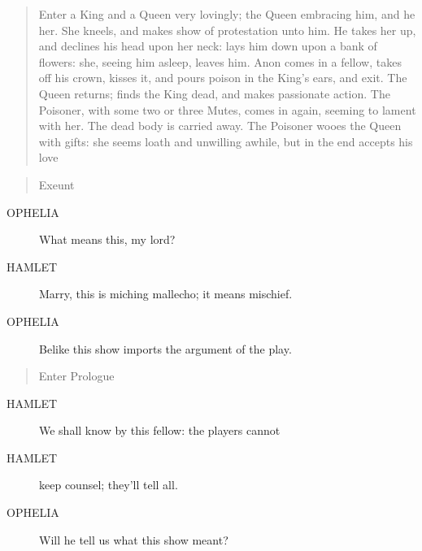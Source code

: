 \documentclass{article}
\begin{document}
\begin{quote}
Enter a King and a Queen very lovingly; the Queen
embracing him, and he her. She kneels, and makes
show of protestation unto him. He takes her up,
and declines his head upon her neck: lays him down
upon a bank of flowers: she, seeing him asleep,
leaves him. Anon comes in a fellow, takes off his
crown, kisses it, and pours poison in the King's
ears, and exit. The Queen returns; finds the King
dead, and makes passionate action. The Poisoner,
with some two or three Mutes, comes in again,
seeming to lament with her. The dead body is
carried away. The Poisoner wooes the Queen with
gifts: she seems loath and unwilling awhile, but
in the end accepts his love
\end{quote}
          
\begin{quote}
Exeunt
\end{quote}
          
\begin{description}
            
\item[OPHELIA] What means this, my lord?
\end{description}
          
\begin{description}
            
\item[HAMLET] Marry, this is miching mallecho; it means mischief.
\end{description}
          
\begin{description}
            
\item[OPHELIA] Belike this show imports the argument of the play.
\end{description}
          
\begin{quote}
Enter Prologue
\end{quote}
          
\begin{description}
            
\item[HAMLET] We shall know by this fellow: the players cannot
\item[HAMLET] keep counsel; they'll tell all.
\end{description}
          
\begin{description}
            
\item[OPHELIA] Will he tell us what this show meant?
\end{description}
          
\end{document}
